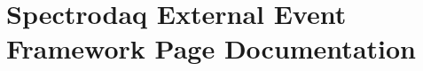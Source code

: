 \documentclass[letterpaper]{book}
\begin{document}
\chapter{Spectrodaq External Event Framework Page Documentation}














\printindex
\end{document}
